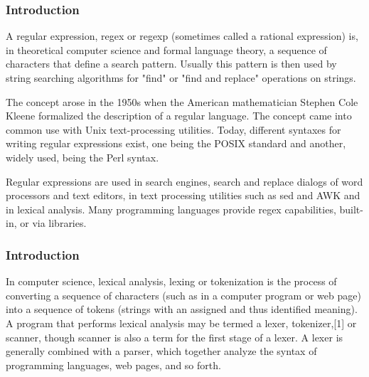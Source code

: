 \begin{frame}
    \frametitle{Introduction}
    \begin{minipage}{\textwidth}
        A regular expression, regex or regexp (sometimes called a rational expression) is, in theoretical computer science and formal language theory, a sequence of characters that define a search pattern. Usually this pattern is then used by string searching algorithms for "find" or "find and replace" operations on strings.

        The concept arose in the 1950s when the American mathematician Stephen Cole Kleene formalized the description of a regular language. The concept came into common use with Unix text-processing utilities. Today, different syntaxes for writing regular expressions exist, one being the POSIX standard and another, widely used, being the Perl syntax.

        Regular expressions are used in search engines, search and replace dialogs of word processors and text editors, in text processing utilities such as sed and AWK and in lexical analysis. Many programming languages provide regex capabilities, built-in, or via libraries.
    \end{minipage}
\end{frame}
        
\begin{frame}
    \frametitle{Introduction}
    \begin{minipage}{\textwidth}
        In computer science, lexical analysis, lexing or tokenization is the process of converting a sequence of characters (such as in a computer program or web page) into a sequence of tokens (strings with an assigned and thus identified meaning). A program that performs lexical analysis may be termed a lexer, tokenizer,[1] or scanner, though scanner is also a term for the first stage of a lexer. A lexer is generally combined with a parser, which together analyze the syntax of programming languages, web pages, and so forth.        
\end{minipage}
\end{frame}

